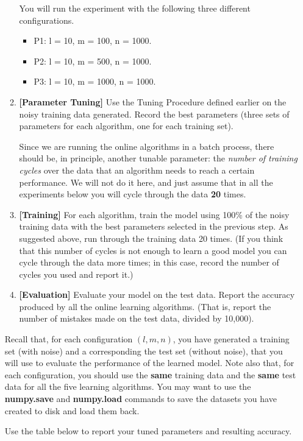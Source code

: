 \begin{enumerate}
\begin{enumerate}
You will run the experiment with the following three different configurations.
\begin{itemize}
\item P1: l = 10, m = 100, n = 1000.
\item P2: l = 10, m = 500, n = 1000.
\item P3: l = 10, m = 1000, n = 1000.
\end{itemize}

\item {\bf [Parameter Tuning]} Use the Tuning Procedure defined earlier on the noisy
training data generated. Record the best parameters (three sets of
parameters for each algorithm, one for each training set).

Since we are running the online algorithms in a batch process, there
should be, in principle, another tunable parameter: the {\em number of
training cycles} over the data that an algorithm needs to reach a
certain performance. We will not do it here, and just assume that in
all the experiments below you will cycle through the data {\bf 20}
times.

\item {\bf [Training]} For each algorithm, train the model using 100\%
  of the noisy training data with the best parameters selected in the
  previous step. As suggested above, run through the training data 20
  times. (If you think that this number of cycles is not enough to
  learn a good model you can cycle through the data more times; in
  this case, record the number of cycles you used and report it.)

\item {\bf [Evaluation]} Evaluate your model on the test data. Report the accuracy produced by all the online learning algorithms. (That is, report the number of mistakes made on the test data, divided by 10,000).
\end{enumerate}

Recall that, for each configuration $(l, m, n)$, you have generated a
training set (with noise) and a corresponding the test set (without noise), that you
will use to evaluate the performance of the learned model. Note also
that, for each configuration, you should use the {\bf same} training data
and the {\bf same} test data for all the five learning algorithms. You may
want to use the {\bf numpy.save} and {\bf numpy.load} commands to save the
datasets you have created to disk and load them back.

\newpage
Use the table below to report your tuned parameters and resulting accuracy.


\end{enumerate}
